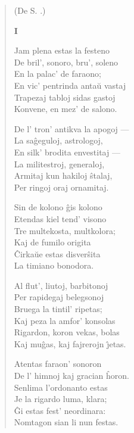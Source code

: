 \begin{verse}
\begin{center}
\footnotesize (De S. .)
\end{center}

\begin{center}
\textbf{I}
\end{center}

                     Jam plena estas la festeno\\
                     De bril', sonoro, bru', soleno\\
                     En la palac' de faraono;\\
                     En vic' pentrinda anta\u u vastaj\\
                     Trapezaj tabloj sidas gastoj\\
                     Konvene, en mez' de salono.

                     De l' tron' antikva la apogoj ---\\
                     La sa\^geguloj, astrologoj,\\
                     En silk' brodita envestitaj ---\\
                     La militestroj, generaloj,\\
                     Armitaj kun hakiloj \^stalaj,\\
                     Per ringoj oraj ornamitaj.

                     Sin de kolono \^gis kolono\\
                     Etendas kiel tend' visono\\
                     Tre multekosta, multkolora;\\
                     Kaj de fumilo origita\\
                     \^Cirka\u ue estas disver\^sita\\
                     La timiano bonodora.

                     Al flut', liutoj, barbitonoj\\
                     Per rapidegaj belegsonoj\\
                     Bruega la tintil' ripetas;\\
                     Kaj peza la amfor' konsolas\\
                     Rigardon, koron vekas, bolas\\
                     Kaj mu\^gas, kaj fajrerojn \^{\j}etas.

                     Atentas faraon' sonoron\\
                     De l' himnoj kaj gracian \^horon.\\
                     Senlima l'ordonanto estas\\
                     Je la rigardo luma, klara;\\
                     \^Gi estas fest' neordinara:\\
                     Nomtagon sian li nun festas.


\end{verse}
